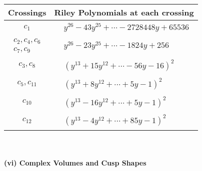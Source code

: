 \documentclass[1p]{elsarticle_modified}
\theoremstyle{definition}
\begin{document}
\begin{tabular}{m{50pt}|m{274pt}}
Crossings & \hspace{64pt}Riley Polynomials at each crossing \\
\hline $$\begin{aligned}c_{1}\end{aligned}$$&$\begin{aligned}
&y^{26}-43 y^{25}+\cdots-2728448 y+65536
\end{aligned}$\\
\hline $$\begin{aligned}c_{2},c_{4},c_{6}\\c_{7},c_{9}\end{aligned}$$&$\begin{aligned}
&y^{26}-23 y^{25}+\cdots-1824 y+256
\end{aligned}$\\
\hline $$\begin{aligned}c_{3},c_{8}\end{aligned}$$&$\begin{aligned}
&(y^{13}+15 y^{12}+\cdots-56 y-16)^{2}
\end{aligned}$\\
\hline $$\begin{aligned}c_{5},c_{11}\end{aligned}$$&$\begin{aligned}
&(y^{13}+8 y^{12}+\cdots+5 y-1)^{2}
\end{aligned}$\\
\hline $$\begin{aligned}c_{10}\end{aligned}$$&$\begin{aligned}
&(y^{13}-16 y^{12}+\cdots+5 y-1)^{2}
\end{aligned}$\\
\hline $$\begin{aligned}c_{12}\end{aligned}$$&$\begin{aligned}
&(y^{13}-4 y^{12}+\cdots+85 y-1)^{2}
\end{aligned}$\\
\hline
\end{tabular}\\~\\
\newpage\flushleft \textbf{(vi) Complex Volumes and Cusp Shapes}
\end{document}
